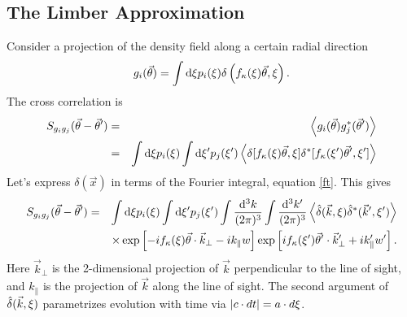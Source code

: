 \subsection{The Limber Approximation}%
Consider a projection of the density field along a certain radial direction
\begin{equation}
  g_i(\vec{\theta}) = \int \mathrm{d}\xi p_i(\xi)\delta\left(f_\kappa(\xi)\vec{\theta},\xi\right).
\end{equation}
The cross correlation is
\begin{eqnarray}
  \label{Sgg}
  S_{g_ig_j}(\vec\theta-\vec\theta^\prime) 
  &=& \left\langle g_i(\vec\theta)g^*_j(\vec\theta^\prime)\right\rangle \nonumber\\
  &=& \int \mathrm{d}\xi p_i(\xi)
  \int \mathrm{d}\xi^\prime p_j(\xi^\prime)
  \left\langle\delta[f_\kappa(\xi)\vec{\theta},\xi]
  \delta^*[f_\kappa(\xi^\prime)\vec{\theta}^\prime,\xi^\prime]
  \right\rangle
\end{eqnarray}
Let's express $\delta(\vec x)$ in terms of the Fourier integral, equation \ref{ft}.  This gives
\begin{eqnarray}
  S_{g_ig_j}(\vec\theta-\vec\theta^\prime) 
  &=& \int \mathrm{d}\xi p_i(\xi)
  \int \mathrm{d}\xi^\prime p_j(\xi^\prime)
  \int \frac{\mathrm{d}^3k}{(2\pi)^3}\int \frac{\mathrm{d}^3k^\prime}{(2\pi)^3}
  \left\langle\hat\delta(\vec k,\xi)
  \hat\delta^*(\vec k^\prime, \xi^\prime)
  \right\rangle\nonumber\\
  &&\times
  \exp\left[-i f_\kappa(\xi)\vec{\theta}\cdot \vec k_\perp -i k_\parallel w\right]
  \exp\left[i f_\kappa(\xi^\prime)\vec{\theta}^\prime \cdot \vec k^\prime_\perp  + i k^\prime_\parallel w^\prime\right].
\end{eqnarray}
Here $\vec k_\perp$ is the 2-dimensional projection of $\vec k$ perpendicular to 
the line of sight, and $k_\parallel$ is the projection of $\vec k$ along 
the line of sight.
The second argument of $\hat\delta(\vec k,\xi)$ parametrizes evolution with
time via $|c\cdot dt| = a\cdot d\xi$.

